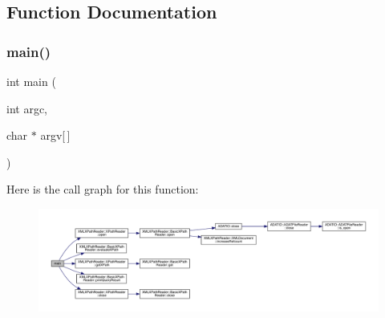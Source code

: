 \subsection{Function Documentation}
\mbox{\label{adat-devel_2other__libs_2xpath__reader_2examples_2print__xpath_8cc_a0ddf1224851353fc92bfbff6f499fa97}} 
\subsubsection{\texorpdfstring{main()}{main()}}
{\footnotesize\ttfamily int main (\begin{DoxyParamCaption}\item[{int}]{argc,  }\item[{char $\ast$}]{argv\mbox{[}$\,$\mbox{]} }\end{DoxyParamCaption})}

Here is the call graph for this function\+:
\nopagebreak
\begin{figure}[H]
\begin{center}
\leavevmode
\includegraphics[width=350pt]{d4/dc6/adat-devel_2other__libs_2xpath__reader_2examples_2print__xpath_8cc_a0ddf1224851353fc92bfbff6f499fa97_cgraph}
\end{center}
\end{figure}
